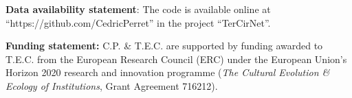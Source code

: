 \documentclass{rstb}
\begin{document}
\begin{linenumbers}
\textbf{Data availability statement}: The code is available online at\\ ``https://github.com/CedricPerret'' in the project ``TerCirNet''.

\textbf{Funding statement:} C.P. \& T.E.C. are supported by funding awarded to T.E.C. from the European Research Council (ERC) under the European Union’s Horizon 2020 research and innovation programme (\textit{The Cultural Evolution \& Ecology of Institutions}, Grant Agreement 716212).







\end{linenumbers}
\end{document}
